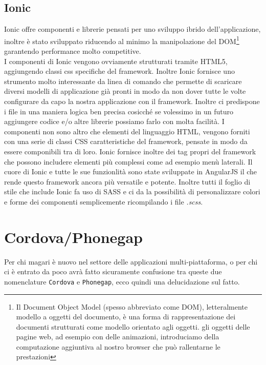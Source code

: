 \subsection{Ionic}
Ionic offre componenti e librerie pensati per uno sviluppo ibrido dell'applicazione, inoltre è stato sviluppato riducendo al minimo la manipolazione del DOM\footnote{Il Document Object Model (spesso abbreviato come DOM), letteralmente modello a oggetti del documento, è una forma di rappresentazione dei documenti strutturati come modello orientato agli oggetti.\cite{wiki:dom} gli oggetti delle pagine web, ad esempio con delle animazioni, introduciamo della computazione aggiuntiva al nostro browser che può rallentarne le prestazioni} garantendo performance molto competitive.\\
I componenti di Ionic vengono ovviamente strutturati tramite HTML5, aggiungendo classi css specifiche del framework. Inoltre 
Ionic fornisce uno strumento molto interessante da linea di comando che permette di scaricare diversi modelli di applicazione già pronti in modo da non dover tutte le volte configurare da capo la nostra applicazione con il framework. Inoltre ci predispone i file in una maniera logica ben precisa cosicché se volessimo in un futuro aggiungere codice e/o altre librerie possiamo farlo con molta facilità.
I componenti non sono altro che elementi del linguaggio HTML, vengono forniti con una serie di classi CSS caratteristiche del framework, pensate in modo da essere componibili tra di loro. Ionic fornisce inoltre dei tag propri del framework che possono includere elementi più complessi come ad esempio menù laterali.
Il cuore di Ionic e tutte le sue funzionlità sono state sviluppate in AngularJS il che rende questo framework ancora più versatile e potente. Inoltre tutti il foglio di stile che include Ionic fa uso di SASS e ci da la possibilità di personalizzare colori e forme dei componenti semplicemente ricompilando i file \emph{.scss}.
\section{Cordova/Phonegap}
Per chi magari è nuovo nel settore delle applicazioni multi-piattaforma, o per chi ci è entrato da poco avrà fatto sicuramente confusione tra queste due nomenclature \texttt{Cordova} e \texttt{Phonegap}, ecco quindi una delucidazione sul fatto.
